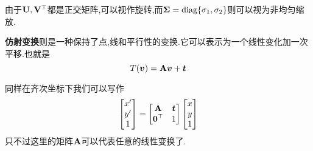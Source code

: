 由于$\bold{U}, \bold{V}^\top$都是正交矩阵,可以视作旋转,而$\bold{\Sigma} = \textup{diag} \{\sigma_1, \sigma_2\}$则可以视为非均匀缩放.

\textbf{仿射变换}则是一种保持了点,线和平行性的变换.它可以表示为一个线性变化加一次平移.也就是
\begin{equation}
	T(\boldsymbol v) = \bold{A} \boldsymbol v + \boldsymbol t
\end{equation}

同样在齐次坐标下我们可以写作
\begin{equation}
	\begin{bmatrix}
		x^\prime
		\\
		y^\prime
		\\
		1
	\end{bmatrix} = 
	\begin{bmatrix}
		\bold{A} & \boldsymbol t
		\\
		\boldsymbol 0^\top & 1
	\end{bmatrix}
	\begin{bmatrix}
		x
		\\
		y\\
		1
	\end{bmatrix}
\end{equation}
只不过这里的矩阵$\bold{A}$可以代表任意的线性变换了.

